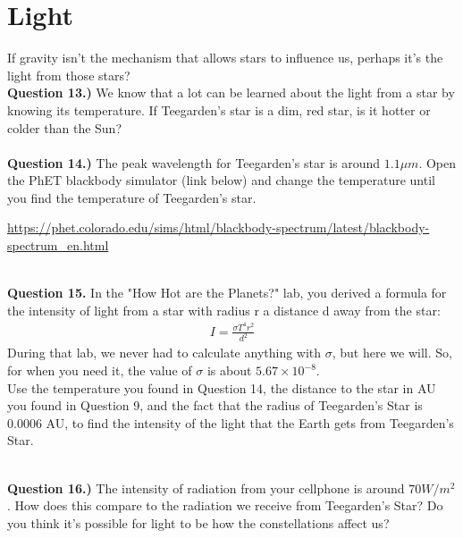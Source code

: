 \documentclass[11pt]{article}
\begin{document}
\newpage

\section{Light}
If gravity isn't the mechanism that allows stars to influence us, perhaps it's the light from those stars?\\

\textbf{Question 13.)} We know that a lot can be learned about the light from a star by knowing its temperature. If Teegarden's star is a dim, red star, is it hotter or colder than the Sun?\\

\vspace{1.5cm}
\hrulefill\\

\textbf{Question 14.)} The peak wavelength for Teegarden's star is around $1.1\mu m$. Open the PhET blackbody simulator (link below) and change the temperature until you find the temperature of Teegarden's star.

\begin{center}\small
	\url{https://phet.colorado.edu/sims/html/blackbody-spectrum/latest/blackbody-spectrum_en.html}
\end{center}

\vspace{1.5cm}
\hrulefill\\

\textbf{Question 15.} In the "How Hot are the Planets?" lab, you derived a formula for the intensity of light from a star with radius r a distance d away from the star:
\begin{align*}
I=\frac{\sigma T^4r^2}{d^2}
\end{align*} 
During that lab, we never had to calculate anything with $\sigma$, but here we will. So, for when you need it, the value of $\sigma$ is about $5.67\times 10^{-8}$.\\

Use the temperature you found in Question 14, the distance to the star in AU you found in Question 9, and the fact that the radius of Teegarden's Star is 0.0006 AU, to find the intensity of the light that the Earth gets from Teegarden's Star.\\

\vspace{1.5cm}
\hrulefill\\

\newpage

\textbf{Question 16.)} The intensity of radiation from your cellphone is around $70 W/m^2$. How does this compare to the radiation we receive from Teegarden's Star? Do you think it's possible for light to be how the constellations affect us?\\
\end{document}
